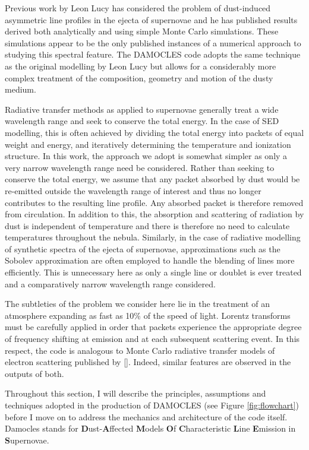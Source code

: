 Previous work by Leon Lucy has considered the problem of dust-induced asymmetric line profiles in the ejecta of supernovae and he has published results derived both analytically and using simple Monte Carlo simulations.  These simulations appear to be the only published instances of a numerical approach to studying this spectral feature.  The DAMOCLES code adopts the same technique as the original modelling by Leon Lucy but allows for a considerably more complex treatment of the composition, geometry and motion of the dusty medium.

Radiative transfer methods as applied to supernovae generally treat a wide wavelength range and seek to conserve the total energy.  In the case of SED modelling, this is often achieved by dividing the total energy into packets of equal weight and energy, and iteratively determining the temperature and ionization structure.  In this work, the approach we adopt is somewhat simpler as only a very narrow wavelength range need be considered.  Rather than seeking to conserve the total energy, we assume that any packet absorbed by dust would be re-emitted outside the wavelength range of interest and thus no longer contributes to the resulting line profile.  Any absorbed packet is therefore removed from circulation.  In addition to this, the absorption and scattering of radiation by dust is independent of temperature and there is therefore no need to calculate temperatures throughout the nebula.  Similarly, in the case of radiative modelling of synthetic spectra of the ejecta of supernovae, approximations such as the Sobolev approximation are often employed to handle the blending of lines more efficiently.  This is unnecessary here as only a single line or doublet is ever treated and a comparatively narrow wavelength range considered. 

The subtleties of the problem we consider here lie in the treatment of an atmosphere expanding as fast as 10\% of the speed of light.  Lorentz transforms must be carefully applied in order that packets experience the appropriate degree of frequency shifting at emission and at each subsequent scattering event.  In this respect, the code is analogous to Monte Carlo radiative transfer models of electron scattering published by \ref{}.  Indeed, similar features are observed in the outputs of both.

Throughout this section, I will describe the principles, assumptions and techniques adopted in the production of DAMOCLES (see Figure \ref{fig:flowchart}) before I move on to address the mechanics and architecture of the code itself.  Damocles stands for \textbf{D}ust-\textbf{A}ffected \textbf{M}odels \textbf{O}f \textbf{C}haracteristic \textbf{L}ine \textbf{E}mission in \textbf{S}upernovae.
 

